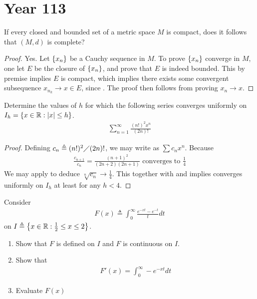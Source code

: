 \documentclass{report}
\begin{document}
\section{Year 113}
\begin{question}{}{}
If every closed and bounded set of a metric space $M$ is compact, does it follows that $(M,d)$ is complete?  
\end{question}
\begin{proof}
  Yes. Let $\left\{ x_n \right\}$ be a Cauchy sequence in $M$. To prove $\left\{ x_n \right\}$ converge in $M$, one let  $E$ be the closure of  $\left\{ x_n \right\}$, and prove that $E$ is indeed bounded. This by premise implies $E$ is compact, which implies there exists some convergent subsequence  $x_{n_k}\rightarrow x \in E$, since . The proof then follows from proving $x_n \rightarrow x$. 
\end{proof}
\begin{question}{}{}
Determine the values of $h$ for which the following series converges uniformly on  $I_h=\left\{ x\in\mathbb{R}:\left|x\right|\leq h \right\}$.
\begin{align}
\label{tgq}
\sum_{n=1}^{\infty} \frac{(n!)^2x^n}{(2n)!}
\end{align}
\end{question}
\begin{proof}
Defining $c_n\triangleq (n!)^2 \diagup (2n)!$, we may write   as $\sum c_n x^n$. Because 
\begin{align*}
\frac{c_{n+1}}{c_n}= \frac{(n+1)^2}{(2n+2)(2n+1)}\text{ converges to }\frac{1}{4}
\end{align*}
We may apply  to deduce $\sqrt[n]{c_n}\rightarrow \frac{1}{4}$. This together with  and  implies  converges uniformly on $I_h$ at least for any $h<4$. 

\end{proof}
\begin{question}{}{}
Consider 
\begin{align*}
F(x)\triangleq \int_0^{\infty} \frac{e^{-xt}-e^{-t}}{t}dt
\end{align*}
on $I\triangleq \left\{ x\in\mathbb{R}:\frac{1}{2}\leq x\leq 2 \right\}$. 
\begin{enumerate}[label=(\roman*)]
  \item Show that $F$ is defined on $I$ and  $F$ is continuous on $I$.  
  \item Show that 
    \begin{align*}
    F'(x)=\int_0^{\infty} -e^{-xt} dt
    \end{align*} 
    \item Evaluate $F(x)$
\end{enumerate}
\end{question}
\end{document}
